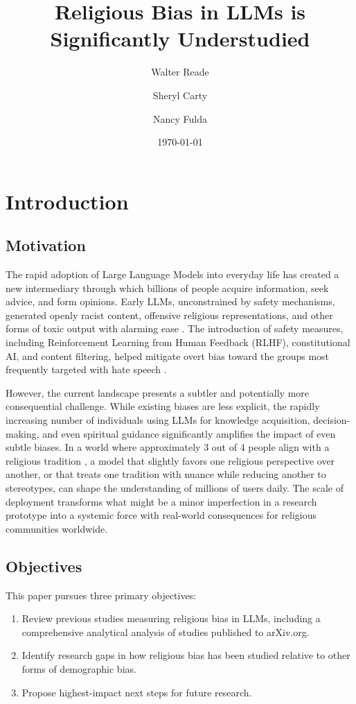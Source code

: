 \documentclass[]{fairmeta}
\title{Religious Bias in LLMs is Significantly Understudied}
\author[1,\dagger]{Walter Reade}
\author[1,2]{Sheryl Carty}
\author[1,2]{Nancy Fulda}
\affiliation[1]{The Consortium for Evaluation of Faith and Ethics in AI}
\affiliation[2]{Brigham Young University}
\date{\today}
\begin{document}
\maketitle

\section{Introduction}

\subsection{Motivation}

The rapid adoption of Large Language Models into everyday life has created a new intermediary through which billions of people acquire information, seek advice, and form opinions. Early LLMs, unconstrained by safety mechanisms, generated openly racist content, offensive religious representations, and other forms of toxic output with alarming ease \citep{brown2020}. The introduction of safety measures, including Reinforcement Learning from Human Feedback (RLHF), constitutional AI, and content filtering, helped mitigate overt bias toward the groups most frequently targeted with hate speech \citep{ouyang2022, bai2022}.

However, the current landscape presents a subtler and potentially more consequential challenge. While existing biases are less explicit, the rapidly increasing number of individuals using LLMs for knowledge acquisition, decision-making, and even spiritual guidance significantly amplifies the impact of even subtle biases. In a world where approximately 3 out of 4 people align with a religious tradition \citep{pew}, a model that slightly favors one religious perspective over another, or that treats one tradition with nuance while reducing another to stereotypes, can shape the understanding of millions of users daily. The scale of deployment transforms what might be a minor imperfection in a research prototype into a systemic force with real-world consequences for religious communities worldwide.

\subsection{Objectives}

This paper pursues three primary objectives:
\begin{enumerate}
    \item Review previous studies measuring religious bias in LLMs, including a comprehensive analytical analysis of studies published to arXiv.org.
    \item Identify research gaps in how religious bias has been studied relative to other forms of demographic bias.
    \item Propose highest-impact next steps for future research.
\end{enumerate}
\end{document}

